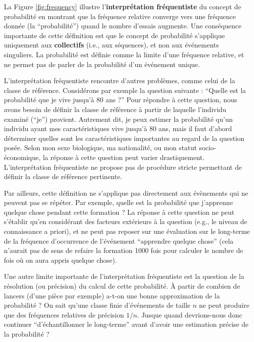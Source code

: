 \documentclass[
  a4paper,11pt,twoside,onecolumn,openright,final,oldfontcommands]{memoir}
\theoremstyle{definition}
\theoremstyle{definition}
\theoremstyle{definition}
\theoremstyle{definition}
\theoremstyle{remark}
\begin{document}
La Figure \ref{fig:frequency} illustre l'\textbf{interprétation fréquentiste} du concept de probabilité en montrant que la fréquence relative converge vers une fréquence donnée (la ``probabilité'') quand le nombre d'essais augmente. Une conséquence importante de cette définition est que le concept de probabilité s'applique uniquement aux \textbf{collectifs} (i.e., aux séquences), et non aux événements singuliers. La probabilité est définie comme la limite d'une fréquence relative, et ne permet pas de parler de la probabilité d'un événement unique.

L'interprétation fréquentiste rencontre d'autres problèmes, comme celui de la classe de référence. Considérons par exemple la question suivante : ``Quelle est la probabilité que je vive jusqu'à 80 ans ?'' Pour répondre à cette question, nous avons besoin de définir la classe de référence à partir de laquelle l'individu examiné (``je'') provient. Autrement dit, je peux estimer la probabilité qu'un individu ayant mes caractéristiques vive jusqu'à 80 ans, mais il faut d'abord déterminer quelles sont les caractéristiques importantes au regard de la question posée. Selon mon sexe biologique, ma nationalité, ou mon statut socio-économique, la réponse à cette question peut varier drastiquement. L'interprétation fréquentiste ne propose pas de procédure stricte permettant de définir la classe de référence pertinente.

Par ailleurs, cette définition ne s'applique pas directement aux évènements qui ne peuvent pas se répéter. Par exemple, quelle est la probabilité que j'apprenne quelque chose pendant cette formation ? La réponse à cette question ne peut s'établir qu'en considérant des facteurs extérieurs à la question (e.g., le niveau de connaissance a priori), et ne peut pas reposer sur une évaluation sur le long-terme de la fréquence d'occurrence de l'événement ``apprendre quelque chose'' (cela n'aurait pas de sens de refaire la formation 1000 fois pour calculer le nombre de fois où on aura appris quelque chose).

Une autre limite importante de l'interprétation fréquentiste est la question de la résolution (ou précision) du calcul de cette probabilité. À partir de combien de lancers (d'une pièce par exemple) a-t-on une bonne approximation de la probabilité ? On sait qu'une classe finie d'événements de taille \(n\) ne peut produire que des fréquences relatives de précision \(1/n\). Jusque quand devrions-nous donc continuer ``d'échantillonner le long-terme'' avant d'avoir une estimation précise de la probabilité ?
\end{document}
